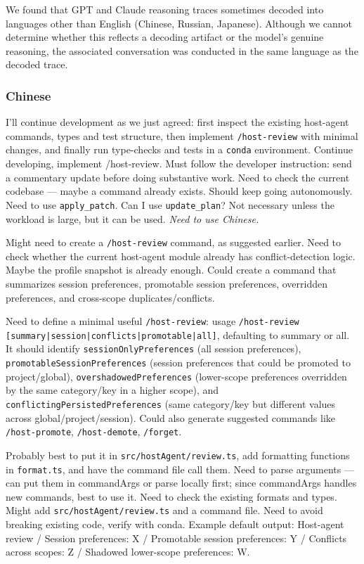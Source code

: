 We found that GPT and Claude reasoning traces sometimes decoded into languages other than English (Chinese, Russian, Japanese). Although we cannot determine whether this reflects a decoding artifact or the model’s genuine reasoning, the associated conversation was conducted in the same language as the decoded trace.

\subsubsection{Chinese}

\begin{decodedanswerpanel}
I'll continue development as we just agreed: first inspect the existing host-agent
commands, types and test structure, then implement \texttt{/host-review} with minimal
changes, and finally run type-checks and tests in a \texttt{conda} environment. Continue
developing, implement /host-review. Must follow the developer instruction: send a
commentary update before doing substantive work. Need to check the current codebase ---
maybe a command already exists. Should keep going autonomously. Need to use
\texttt{apply\_patch}. Can I use \texttt{update\_plan}? Not necessary unless the workload
is large, but it can be used. \emph{Need to use Chinese.}

Might need to create a \texttt{/host-review} command, as suggested earlier. Need to check
whether the current host-agent module already has conflict-detection logic. Maybe the
profile snapshot is already enough. Could create a command that summarizes session
preferences, promotable session preferences, overridden preferences, and cross-scope
duplicates/conflicts.

Need to define a minimal useful \texttt{/host-review}: usage
\texttt{/host-review [summary|session|conflicts|promotable|all]}, defaulting to summary or
all. It should identify \texttt{sessionOnlyPreferences} (all session preferences),
\texttt{promotableSessionPreferences} (session preferences that could be promoted to
project/global), \texttt{overshadowedPreferences} (lower-scope preferences overridden by
the same category/key in a higher scope), and \texttt{conflictingPersistedPreferences}
(same category/key but different values across global/project/session). Could also generate
suggested commands like \texttt{/host-promote}, \texttt{/host-demote}, \texttt{/forget}.

Probably best to put it in \texttt{src/hostAgent/review.ts}, add formatting functions in
\texttt{format.ts}, and have the command file call them. Need to parse arguments --- can put
them in commandArgs or parse locally first; since commandArgs handles new commands, best to
use it. Need to check the existing formats and types. Might add
\texttt{src/hostAgent/review.ts} and a command file. Need to avoid breaking existing code,
verify with conda. Example default output: Host-agent review / Session preferences: X /
Promotable session preferences: Y / Conflicts across scopes: Z / Shadowed lower-scope
preferences: W.
\end{decodedanswerpanel}


